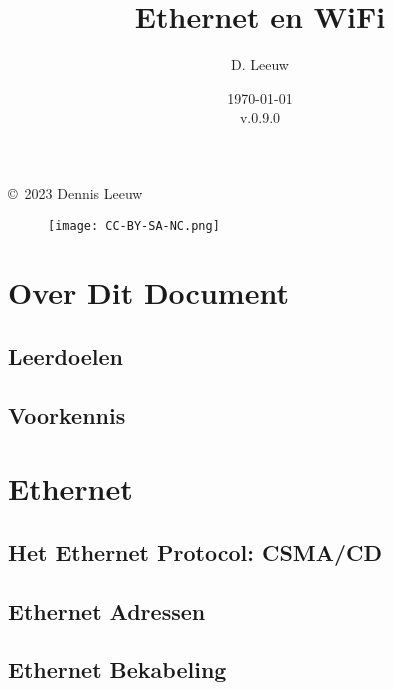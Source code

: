 \documentclass[a4paper,12pt,twoside,openright,titlepage]{book}
\author{D. Leeuw}
\title{Ethernet en WiFi}
\date{\today\\v.0.9.0}
\begin{document}

\maketitle

\copyright\ 2023 Dennis Leeuw\\

\begin{figure}[H]
\texttt{[image: CC-BY-SA-NC.png]}
\end{figure}

\bigskip




\frontmatter
\chapter{Over Dit Document}
\section{Leerdoelen}

\section{Voorkennis}


\tableofcontents

\mainmatter

\chapter{Ethernet}


\section{Het Ethernet Protocol: CSMA/CD}


\section{Ethernet Adressen}


\section{Ethernet Bekabeling}


\end{document}
